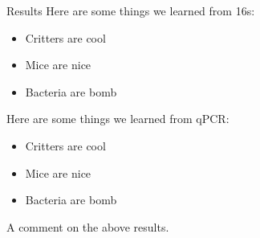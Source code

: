 \documentclass[final]{beamer}
\newlength{\sepwidth}
\newlength{\colwidth}
\newcommand{\separatorcolumn}{\begin{column}{\sepwidth}\end{column}}
\begin{document}
\begin{frame}[t]
\begin{columns}[t]
\separatorcolumn

\begin{column}{\colwidth}
    \begin{block}{Results}
      Here are some things we learned from 16s:

      \begin{itemize}
        \item Critters are cool
        \item Mice are nice
        \item Bacteria are bomb
      \end{itemize}

      Here are some things we learned from qPCR:

      \begin{itemize}
        \item Critters are cool
        \item Mice are nice
        \item Bacteria are bomb
      \end{itemize}

    \begin{tcolorbox}
    [width=\textwidth, colframe=blue]
    {A comment on the above results}.
    \end{tcolorbox}


\end{block}
\end{column}
\end{columns}
\end{frame}
\end{document}
